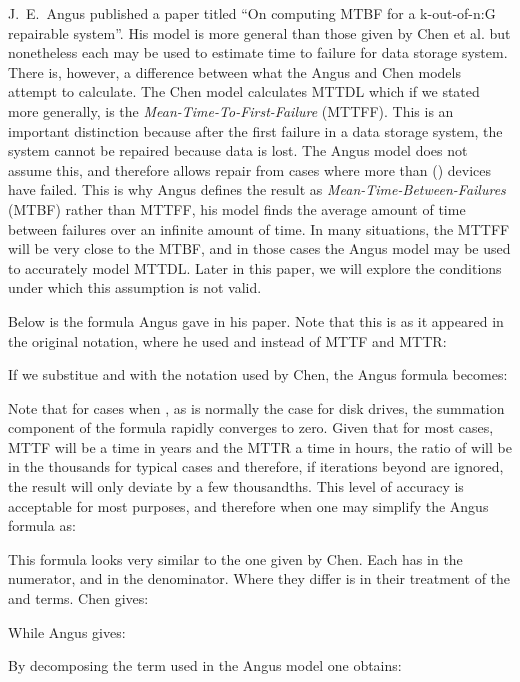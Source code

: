 \documentclass[XXX,endnotes]{usetex-v1}
\begin{document}
J.~E.~Angus published a paper titled ``On computing MTBF for a k-out-of-n:G repairable system''\cite{markov}.  His model is more general than those given by Chen et al. but nonetheless each may be used to estimate time to failure for data storage system.  There is, however, a difference between what the Angus and Chen models attempt to calculate.  The Chen model calculates MTTDL which if we stated more generally, is the \emph{Mean-Time-To-First-Failure} (MTTFF).  This is an important distinction because after the first failure in a data storage system, the system cannot be repaired because data is lost.  The Angus model does not assume this, and therefore allows repair from cases where more than () devices have failed.  This is why Angus defines the result as \emph{Mean-Time-Between-Failures} (MTBF) rather than MTTFF, his model finds the average amount of time between failures over an infinite amount of time.  In many situations, the MTTFF will be very close to the MTBF, and in those cases the Angus model may be used to accurately model MTTDL.  Later in this paper, we will explore the conditions under which this assumption is not valid.

Below is the formula Angus gave in his paper.  Note that this is as it appeared in the original notation, where he used  and  instead of MTTF and MTTR:



If we substitue  and  with the notation used by Chen, the Angus formula becomes:



Note that for cases when , as is normally the case for disk drives, the summation component of the formula rapidly converges to zero.  Given that for most cases, MTTF will be a time in years and the MTTR a time in hours, the ratio of  will be in the thousands for typical cases and therefore, if iterations beyond  are ignored, the result will only deviate by a few thousandths.  This level of accuracy is acceptable for most purposes, and therefore when  one may simplify the Angus formula as:



This formula looks very similar to the one given by Chen.  Each has  in the numerator, and  in the denominator.  Where they differ is in their treatment of the  and  terms.  Chen gives:



While Angus gives:



By decomposing the  term used in the Angus model one obtains:
\end{document}
